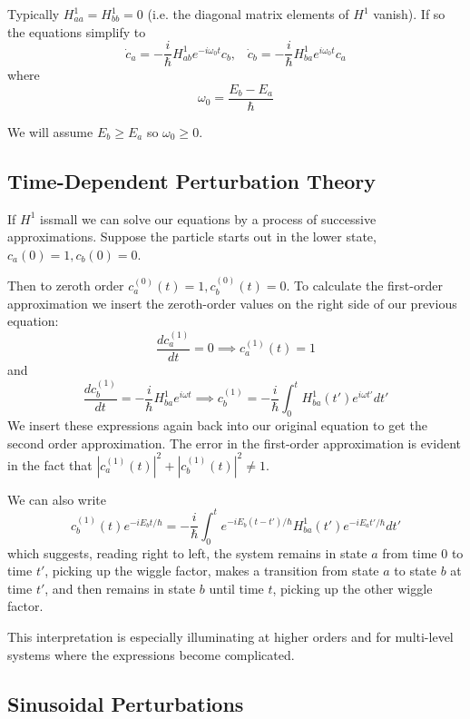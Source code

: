 \documentclass[12pt, a4paper, oneside, openright, titlepage]{book}
\begin{document}
Typically $H^1_{aa} = H^1_{bb} = 0$ (i.e. the diagonal matrix elements of $H^1$ vanish). If so the equations simplify to $$\dot{c}_a = -\frac{i}{\hbar}H^1_{ab}e^{-i\omega_0t}c_b,\;\;\;\dot{c}_b = -\frac{i}{\hbar}H^1_{ba}e^{i\omega_0t}c_a$$
where $$\omega_0 = \frac{E_b-E_a}{\hbar}$$

We will assume $E_b \geq E_a$ so $\omega_0 \geq 0$.

\subsection{Time-Dependent Perturbation Theory}

If $H^1$ issmall we can solve our equations by a process of successive approximations. Suppose the particle starts out in the lower state, $c_a(0) = 1, c_b(0) = 0$.

Then to zeroth order $c_a^{(0)}(t) = 1, c_b^{(0)}(t) = 0$. To calculate the first-order approximation we insert the zeroth-order values on the right side of our previous equation: $$\frac{dc_a^{(1)}}{dt} = 0\implies c_a^{(1)}(t) = 1$$ 
and $$\frac{dc_b^{(1)}}{dt} = -\frac{i}{\hbar}H_{ba}^1e^{i\omega t}\implies c_b^{(1)} = -\frac{i}{\hbar}\int_0^tH_{ba}^1(t')e^{i\omega t'}dt'$$
We insert these expressions again back into our original equation to get the second order approximation. The error in the first-order approximation is evident in the fact that $|c_a^{(1)}(t)|^2+|c_b^{(1)}(t)|^2 \neq 1$.

We can also write $$c_b^{(1)}(t)e^{-iE_bt/\hbar} = -\frac{i}{\hbar}\int_0^te^{-iE_b(t-t')/\hbar}H_{ba}^1(t')e^{-iE_at'/\hbar}dt'$$
which suggests, reading right to left, the system remains in state $a$ from time $0$ to time $t'$, picking up the wiggle factor, makes a transition from state $a$ to state $b$ at time $t'$, and then remains in state $b$ until time $t$, picking up the other wiggle factor.

This interpretation is especially illuminating at higher orders and for multi-level systems where the expressions become complicated. 


\subsection{Sinusoidal Perturbations}
\end{document}
